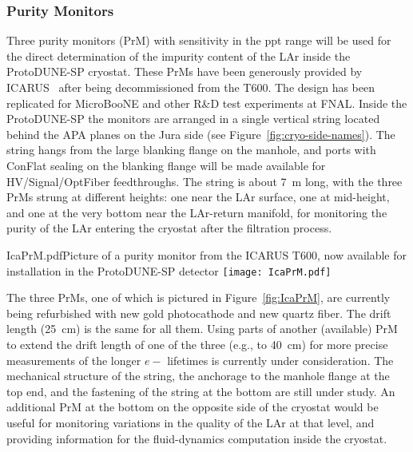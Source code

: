 \subsubsection{Purity Monitors} 
Three purity monitors (PrM) with sensitivity in the ppt range will be used for the direct determination of the impurity content of the LAr inside the ProtoDUNE-SP cryostat. These PrMs have been generously provided by ICARUS~\cite{Ica-PrM-TM} after being decommissioned from the T600. The design has been replicated for MicroBooNE and other R\&D test experiments at FNAL. Inside the ProtoDUNE-SP the monitors are arranged in a single vertical string located behind the APA planes on the Jura side (see Figure~\ref{fig:cryo-side-names}). The string hangs from the large blanking flange on the manhole, and ports with ConFlat sealing on the blanking flange will be made available for HV/Signal/OptFiber feedthroughs. The string is about 7~m long, with the three PrMs strung at different heights: one near the LAr surface, one at mid-height, and one at the very bottom near the LAr-return manifold, %
for monitoring the purity of the LAr entering the cryostat after the filtration process.  

\begin{cdrfigure}{IcaPrM.pdf}{Picture of a purity monitor from the ICARUS T600, now available for installation in the ProtoDUNE-SP detector}
\texttt{[image: IcaPrM.pdf]} 
\end{cdrfigure}


The three PrMs, one of which is pictured in Figure~\ref{fig:IcaPrM}, are currently being refurbished with new gold photocathode and new quartz fiber. The drift length  (25~cm) is the same for all them. Using parts of another (available) PrM to extend the drift length of one of the three (e.g., to 40~cm) for more precise measurements of the longer $e-$ lifetimes is currently %
under consideration.
The mechanical structure of the string, the anchorage to the manhole flange at the top end, and the fastening of the string at the bottom %
are still under study.
An additional PrM at the bottom on the opposite side of the cryostat would be useful for %
monitoring variations in the quality of 
the LAr at that level, and providing information for the fluid-dynamics computation inside the cryostat. \\

